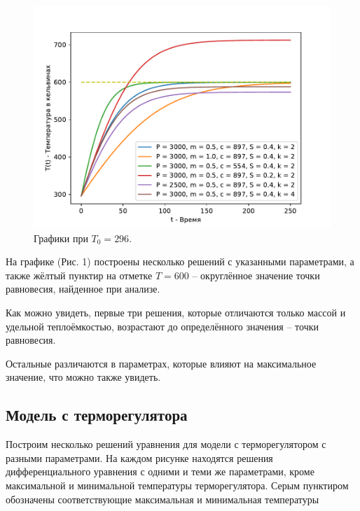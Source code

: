         \begin{figure}[H]
            \centering
            \includegraphics[width=17cm]{pictures/utug1.pdf}
            \caption{Графики при $T_0 = 296$.}
        \end{figure}

        На графике (Рис. 1) построены несколько решений с указанными параметрами, а также жёлтый пунктир на отметке $T = 600$ -- округлённое значение точки равновесия, найденное при анализе.
        
        Как можно увидеть, первые три решения, которые отличаются только массой и удельной теплоёмкостью, возрастают до определённого значения -- точки равновесия. 
        
        Остальные различаются в параметрах, которые влияют на максимальное значение, что можно также увидеть.
    
    \subsection{Модель с терморегулятора}
        Построим несколько решений уравнения для модели с терморегулятором с разными параметрами. На каждом рисунке находятся решения дифференциального уравнения с одними и теми же параметрами, кроме максимальной и минимальной температуры терморегулятора. Серым пунктиром обозначены соответствующие максимальная и минимальная температуры


